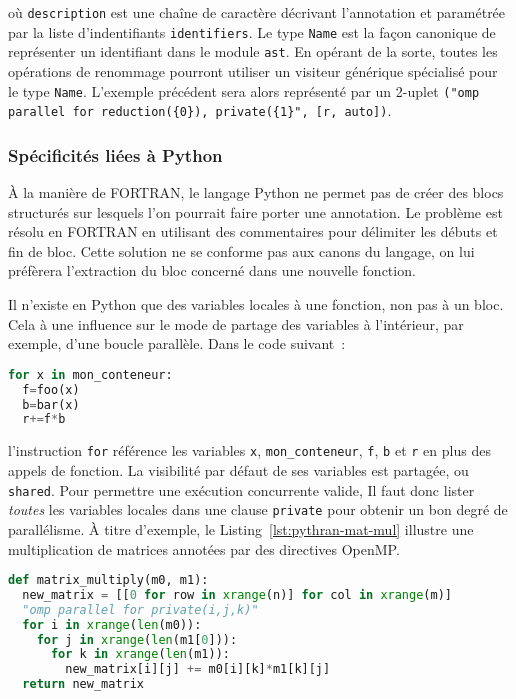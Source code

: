 \documentclass[renpar]{compas2013}
\begin{document}
\noindent où \texttt{description} est une chaîne de caractère décrivant
l'annotation et paramétrée par la liste d'indentifiants \texttt{identifiers}.
Le type \texttt{Name} est la façon canonique de représenter un identifiant dans
le module \texttt{ast}.  En opérant de la sorte, toutes les opérations de
renommage pourront utiliser un visiteur générique spécialisé pour le type
\texttt{Name}. L'exemple précédent sera alors représenté par un 2-uplet
\texttt{("omp parallel for reduction(\{0\}), private(\{1\}", [r, auto])}.

\subsubsection{Spécificités liées à Python}

À la manière de FORTRAN, le langage Python ne permet pas de créer des
blocs structurés sur lesquels l'on pourrait faire porter une annotation.
Le problème est résolu en FORTRAN en utilisant des commentaires pour
délimiter les débuts et fin de bloc. Cette solution ne se conforme pas aux
canons du langage, on lui préfèrera l'extraction du bloc concerné dans une
nouvelle fonction.

Il n'existe en Python que des variables locales à une fonction, non pas à
un bloc. Cela à une influence sur le mode de partage des variables à
l'intérieur, par exemple, d'une boucle parallèle. Dans le code suivant~:

\begin{lstlisting}[language=python]
for x in mon_conteneur:
  f=foo(x)
  b=bar(x)
  r+=f*b
\end{lstlisting}

\noindent l'instruction \texttt{for} référence les variables \texttt{x},
\texttt{mon\_conteneur}, \texttt{f}, \texttt{b} et \texttt{r} en plus des
appels de fonction. La visibilité par défaut de ses variables est
partagée, ou \texttt{shared}. Pour permettre une exécution concurrente
valide, Il faut donc lister \emph{toutes} les variables locales
dans une clause \texttt{private} pour obtenir un bon degré de
parallélisme.  À titre d'exemple, le Listing~\ref{lst:pythran-mat-mul}
illustre une multiplication de matrices annotées par des directives
OpenMP.

\begin{lstlisting}[language=python, label={lst:pythran-mat-mul},caption={multiplication de matrice avec
  annotations OpenMP}]
def matrix_multiply(m0, m1):
  new_matrix = [[0 for row in xrange(n)] for col in xrange(m)]
  "omp parallel for private(i,j,k)"
  for i in xrange(len(m0)):
    for j in xrange(len(m1[0])):
      for k in xrange(len(m1)):
        new_matrix[i][j] += m0[i][k]*m1[k][j]
  return new_matrix
\end{lstlisting}
\end{document}
